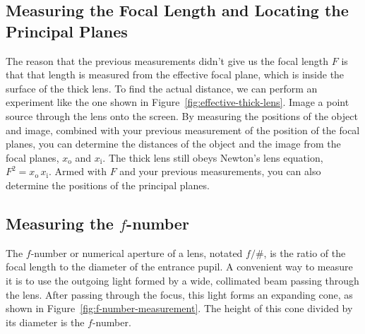 \documentclass[]{manual}
\begin{document}
    \subsection{Measuring the Focal Length and Locating the Principal Planes}

    The reason that the previous measurements didn't give us the focal length $F$ is that that length is measured from the effective focal plane, which is inside the surface of the thick lens.
    To find the actual distance, we can perform an experiment like the one shown in Figure~\ref{fig:effective-thick-lens}.
    Image a point source through the lens onto the screen.
    By measuring the positions of the object and image, combined with your previous measurement of the position of the focal planes, you can determine the distances of the object and the image from the focal planes, $x_{\mathrm{o}}$ and $x_{\mathrm{i}}$.
    The thick lens still obeys Newton's lens equation, $F^2 = x_{\mathrm{o}} \, x_{\mathrm{i}}$.
    Armed with $F$ and your previous measurements, you can also determine the positions of the principal planes.


    \subsection{Measuring the $f$-number}

    The $f$-number or numerical aperture of a lens, notated $f/\#$, is the ratio of the focal length to the diameter of the entrance pupil.
    A convenient way to measure it is to use the outgoing light formed by a wide, collimated beam passing through the lens.
    After passing through the focus, this light forms an expanding cone, as shown in Figure~\ref{fig:f-number-measurement}.
    The height of this cone divided by its diameter is the $f$-number.

\end{document}
